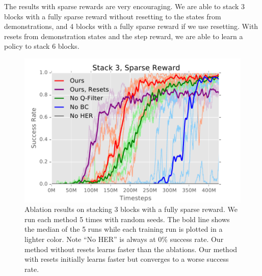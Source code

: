 \documentclass[letterpaper, 10 pt, conference]{ieeeconf}  %
\begin{document}
The results with sparse rewards are very encouraging. We are able to stack 3 blocks with a fully sparse reward without resetting to the states from demonstrations, and 4 blocks with a fully sparse reward if we use resetting. With resets from demonstration states and the step reward, we are able to learn a policy to stack 6 blocks. 

\begin{figure}[t]%
    \vspace{6pt}
    \centering
    \includegraphics[width=0.6\linewidth]{figs/3}
    \caption{Ablation results on stacking 3 blocks with a fully sparse reward. We run each method 5 times with random seeds. The bold line shows the median of the 5 runs while each training run is plotted in a lighter color. Note ``No HER'' is always at 0\% success rate. Our method without resets learns faster than the ablations. Our method with resets initially learns faster but converges to a worse success rate. }%
    \label{fig:ablation3stack}%
\end{figure}
\end{document}
